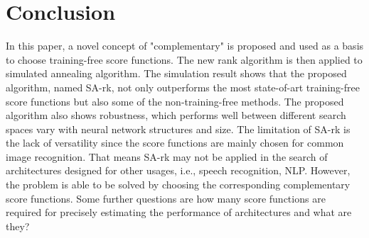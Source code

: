 \documentclass[sigconf]{acmart}
\begin{document}
    \section{Conclusion}
    \label{sec:conclusion}
    In this paper, a novel concept of "complementary" is proposed and used as a basis to choose 
    training-free score functions. The new rank algorithm is then applied to simulated annealing 
    algorithm. The simulation result shows that the proposed algorithm, named SA-rk, not only outperforms the most 
    state-of-art training-free score functions but also some of the non-training-free methods. 
    The proposed algorithm also shows robustness, which performs well between different search 
    spaces vary with neural network structures and size. 
    The limitation of SA-rk is the lack of versatility since the score functions are mainly chosen 
    for common image recognition. That means SA-rk may not be applied in the search of architectures 
    designed for other usages, i.e., speech recognition, NLP. However, the problem is able to be solved 
    by choosing the corresponding complementary score functions. Some further questions are how many 
    score functions are required for precisely estimating the performance of architectures and what are they? 
    
    
    
\end{document}

